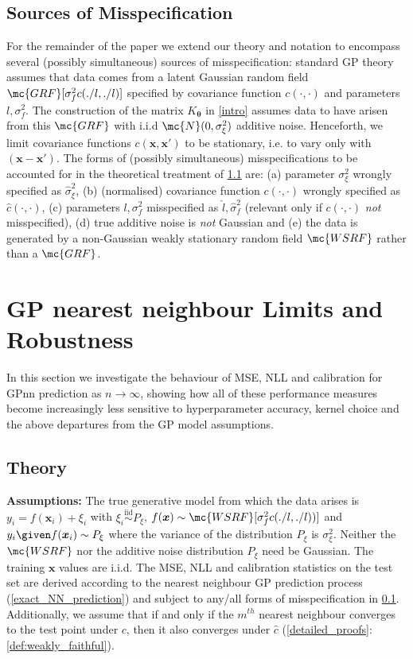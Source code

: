 \subsection{Sources of Misspecification}
\label{misspec}
For the remainder of the paper we extend our theory and notation to encompass several (possibly simultaneous) sources of misspecification: standard GP theory assumes that data comes from a latent Gaussian random field $\mc{GRF}[\sigma_f^2 c(./l,./l)]$ specified by covariance function $c(\cdot,\cdot)$ and parameters $l,\sigma_f^2$. The construction of the matrix $K_{\bm{\theta}}$ in \autoref{intro} assumes data to have arisen from this $\mc{GRF}$ with i.i.d $\mc{N}(0,\sigma_\xi^2)$ additive noise. Henceforth, we limit covariance functions $c(\bm{x},\bm{x}')$ to be stationary, i.e. to vary only with $(\bm{x}-\bm{x}')$. The forms of (possibly simultaneous) misspecifications to be accounted for in the theoretical treatment of \ref{theory} are: (a) parameter $\sigma_\xi^2$ wrongly specified as $\hat{\sigma}_\xi^2$, (b) (normalised) covariance function $c(\cdot,\cdot)$ wrongly specified as $\hat{c}(\cdot,\cdot)$, (c) parameters $l,\sigma_f^2$ misspecified as $\hat{l},\hat{\sigma}_f^2$ (relevant only if $c(\cdot,\cdot)$ {\it not} misspecified), (d) true additive noise is {\it not} Gaussian and (e) the data is generated by a non-Gaussian weakly stationary random field $\mc{WSRF}$ rather than a $\mc{GRF}$.

\section{GP nearest neighbour Limits and Robustness}
\label{robustness}
In this section we investigate the behaviour of MSE, NLL and calibration for GPnn prediction as $n \rightarrow \infty$, showing how all of these performance measures become increasingly less sensitive to hyperparameter accuracy, kernel choice and the above departures from the GP model assumptions. 

\subsection{Theory}
\label{theory}
\textbf{Assumptions:} The true generative model from which the data arises is \(y_i=f(\bm{x}_i) + \xi_i\) with \(\xi_i\overset{\textrm{iid}}{\sim}P_\xi\), \(f(\bm{x})\sim \mc{WSRF}[\sigma_f^2 c(./l,./l))]\) and \(y_i\given f(\bm{x}_i) \sim P_\xi\) where the variance of the distribution $P_\xi$ is $\sigma_\xi^2$. Neither the $\mc{WSRF}$ nor the additive noise distribution $P_\xi$ need be Gaussian. The training $\bm{x}$ values are i.i.d. The MSE, NLL and calibration statistics on the test set are derived according to the nearest neighbour GP prediction process (\ref{exact_NN_prediction}) and subject to any/all forms of misspecification in \ref{misspec}. Additionally, we assume that if and only if the \(m^{th}\) nearest neighbour converges to the test point under \(c\), then it also converges under \(\hat{c}\) (\ref{detailed_proofs}:\autoref{def:weakly_faithful}).



